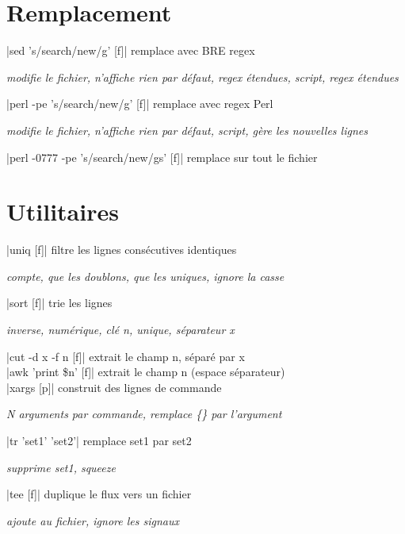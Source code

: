 \documentclass{article}
\newenvironment{cmdblock}{%
  \par\setlength{\parindent}{0pt}\setlength{\parskip}{0pt}%
  \RaggedRight%
}{\par}
\newlength{\cmdoptindent}
\newcommand{\cmdopt}[1]{%
  \hspace*{\cmdoptindent}%
  \begin{minipage}[t]{\dimexpr\linewidth-\cmdoptindent\relax}
    \RaggedRight \itshape #1%
  \end{minipage}\par
}
\begin{document}
\begin{multicols}{4}
    \section*{Remplacement}
    \begin{cmdblock}
        \code|sed 's/search/new/g' [f]| \quad remplace avec BRE regex \\
        \cmdopt{ modifie le fichier,
             n'affiche rien par défaut,
            \codx{-E} regex étendues,
            \codx{-e} script, \codx{-r} regex étendues}
        \code|perl -pe 's/search/new/g' [f]| \quad remplace avec regex Perl \\
        \cmdopt{ modifie le fichier,
             n'affiche rien par défaut,
            \codx{-e} script, \codx{-l} gère les nouvelles lignes}
        \code|perl -0777 -pe 's/search/new/gs' [f]| \quad remplace sur tout le fichier \\
    \end{cmdblock}

    \section*{Utilitaires}
    \begin{cmdblock}
        \code|uniq [f]| \quad filtre les lignes consécutives identiques \\
        \cmdopt{ compte,  que les doublons,
            \codx{-u} que les uniques, \codx{-i} ignore la casse}
        \code|sort [f]| \quad trie les lignes \\
        \cmdopt{ inverse,  numérique,
            \codx{-k n} clé n, \codx{-u} unique,
            \codx{-t x} séparateur x}
        \code|cut -d x -f n [f]| \quad extrait le champ n, séparé par x \\
        \code|awk '{print \$n}' [f]| \quad extrait le champ n (espace séparateur) \\
        \code|xargs [p]| \quad construit des lignes de commande \\
        \cmdopt{ N arguments par commande,
            \codx{-I \{\}} remplace \{\} par l'argument}
        \code|tr 'set1' 'set2'| \quad remplace set1 par set2 \\
        \cmdopt{ supprime set1,  squeeze}
        \code|tee [f]| \quad duplique le flux vers un fichier \\
        \cmdopt{ ajoute au fichier,  ignore les signaux}
    \end{cmdblock}


\end{multicols}
\end{document}
